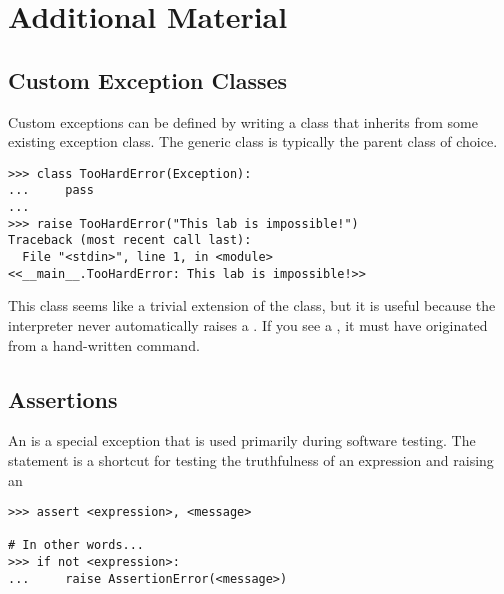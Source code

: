 \newpage

\section*{Additional Material} %

\subsection*{Custom Exception Classes} %

Custom exceptions can be defined by writing a class that inherits from some existing exception class.
The generic  class is typically the parent class of choice.

\begin{lstlisting}
>>> class TooHardError(Exception):
...     pass
...
>>> raise TooHardError("This lab is impossible!")
Traceback (most recent call last):
  File "<stdin>", line 1, in <module>
<<__main__.TooHardError: This lab is impossible!>>
\end{lstlisting}

This class seems like a trivial extension of the  class, but it is useful because the interpreter never automatically raises a .
If you see a , it must have originated from a hand-written  command.

\subsection*{Assertions} %

An  is a special exception that is used primarily during software testing.
The  statement is a shortcut for testing the truthfulness of an expression and raising an 

\begin{lstlisting}
>>> assert <expression>, <message>

# In other words...
>>> if not <expression>:
...     raise AssertionError(<message>)
\end{lstlisting}

\begin{comment} %
\subsection*{Chaining Exceptions} %
\begin{lstlisting}
>>> try:
>>>     raise ValueError("First Exception")
>>> except ValueError as e:
>>>     raise TypeError("Second Exception") from e
\end{lstlisting}
This syntax makes it possible to see where an error originated from and to ``pass it up'' to the next process.
\end{comment}


